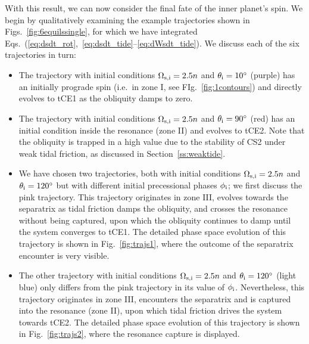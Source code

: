 \documentclass[
        fleqn,
        usenatbib,
    ]{mnras}
\begin{document}
With this result, we can now consider the final fate of the inner planet's spin.
We begin by qualitatively examining the example trajectories shown in
Figs.~\ref{fig:6equilssingle}, for which we have integrated
Eqs.~(\ref{eq:dsdt_rot},~\ref{eq:dsdt_tide}--\ref{eq:dWsdt_tide}). We discuss
each of the six trajectories in turn:
\begin{itemize}
    \item The trajectory with initial conditions $\Omega_{\rm s, i} = 2.5n$ and
        $\theta_{\rm i} = 10^\circ$ (purple) has an initially prograde spin
        (i.e.\ in zone I, see FIg.~\ref{fig:1contours}) and directly evolves to
        tCE1 as the obliquity damps to zero.

    \item The trajectory with initial conditions $\Omega_{\rm s, i} = 2.5n$ and
        $\theta_{\rm i} = 90^\circ$ (red) has an initial condition inside the
        resonance (zone II) and evolves to tCE2. Note that the obliquity is
        trapped in a high value due to the stability of CS2 under weak tidal
        friction, as discussed in Section~\ref{ss:weaktide}.

    \item We have chosen two trajectories, both with initial conditions
        $\Omega_{\rm s, i} = 2.5n$ and $\theta_{\rm i} = 120^\circ$ but with
        different initial precessional phases $\phi_{\rm i}$; we first discuss
        the pink trajectory. This trajectory originates in zone III, evolves
        towards the separatrix as tidal friction damps the obliquity, and
        crosses the resonance without being captured, upon which the obliquity
        continues to damp until the system converges to tCE1. The detailed phase
        space evolution of this trajectory is shown in Fig.~\ref{fig:trajs1},
        where the outcome of the separatrix encounter is very visible.

    \item The other trajectory with initial conditions $\Omega_{\rm s, i} = 2.5n$
        and $\theta_{\rm i} = 120^\circ$ (light blue) only differs from the pink
        trajectory in its value of $\phi_{\rm i}$. Nevertheless, this trajectory
        originates in zone III, encounters the separatrix and is captured into
        the resonance (zone II), upon which tidal friction drives the system
        towards tCE2. The detailed phase space evolution of this trajectory is
        shown in Fig.~\ref{fig:trajs2}, where the resonance capture is
        displayed.


\end{itemize}
\end{document}
